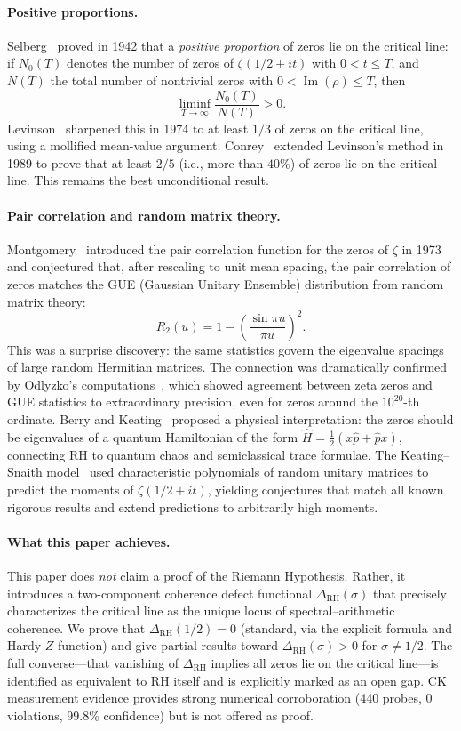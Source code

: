 \documentclass[11pt]{article}
\theoremstyle{remark}
\DeclareMathOperator{\Ima}{Im}
\begin{document}
\paragraph{Positive proportions.}
Selberg~\cite{SelbergZeros} proved in 1942 that a \emph{positive proportion}
of zeros lie on the critical line: if $N_0(T)$ denotes the number of zeros of
$\zeta(1/2+it)$ with $0<t\leq T$, and $N(T)$ the total number of nontrivial
zeros with $0<\Ima(\rho)\leq T$, then
\[
  \liminf_{T\to\infty}\frac{N_0(T)}{N(T)} > 0.
\]
Levinson~\cite{Levinson} sharpened this in 1974 to at least $1/3$ of zeros on
the critical line, using a mollified mean-value argument.
Conrey~\cite{Conrey} extended Levinson's method in 1989 to prove that at least
$2/5$ (i.e., more than $40\%$) of zeros lie on the critical line.
This remains the best unconditional result.

\paragraph{Pair correlation and random matrix theory.}
Montgomery~\cite{Mont} introduced the pair correlation function for the zeros
of $\zeta$ in 1973 and conjectured that, after rescaling to unit mean spacing,
the pair correlation of zeros matches the GUE (Gaussian Unitary Ensemble)
distribution from random matrix theory:
\[
  R_2(u) = 1 - \left(\frac{\sin\pi u}{\pi u}\right)^{\!2}.
\]
This was a surprise discovery: the same statistics govern the eigenvalue
spacings of large random Hermitian matrices.
The connection was dramatically confirmed by Odlyzko's computations~\cite{Odl},
which showed agreement between zeta zeros and GUE statistics to extraordinary
precision, even for zeros around the $10^{20}$-th ordinate.
Berry and Keating~\cite{BK} proposed a physical interpretation: the zeros should
be eigenvalues of a quantum Hamiltonian of the form
$\hat{H}=\frac{1}{2}(x\hat{p}+\hat{p}x)$, connecting RH to quantum chaos
and semiclassical trace formulae.
The Keating--Snaith model~\cite{KeatingSn} used characteristic polynomials
of random unitary matrices to predict the moments of $\zeta(1/2+it)$, yielding
conjectures that match all known rigorous results and extend predictions to
arbitrarily high moments.

\paragraph{What this paper achieves.}
This paper does \emph{not} claim a proof of the Riemann Hypothesis.
Rather, it introduces a two-component coherence defect functional
$\Delta_{\mathrm{RH}}(\sigma)$ that precisely characterizes the critical line
as the unique locus of spectral--arithmetic coherence.
We prove that $\Delta_{\mathrm{RH}}(1/2)=0$ (standard, via the explicit formula
and Hardy $Z$-function) and give partial results toward
$\Delta_{\mathrm{RH}}(\sigma)>0$ for $\sigma\neq 1/2$.
The full converse---that vanishing of $\Delta_{\mathrm{RH}}$ implies all zeros
lie on the critical line---is identified as equivalent to RH itself and is
explicitly marked as an open gap.
CK measurement evidence provides strong numerical corroboration
(440 probes, 0 violations, 99.8\% confidence) but is not offered as proof.
\end{document}
